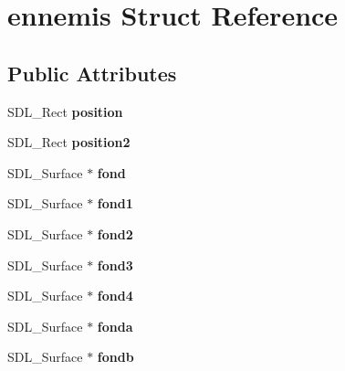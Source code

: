 \hypertarget{structennemis}{}\section{ennemis Struct Reference}
\label{structennemis}
\subsection*{Public Attributes}
\begin{DoxyCompactItemize}
\item 
\mbox{\label{structennemis_a3e8a9864c41c217f29e8fa94c3323414}} 
S\+D\+L\+\_\+\+Rect {\bfseries position}
\item 
\mbox{\label{structennemis_a25ac4c539f00f1d72a98164bbbe17f18}} 
S\+D\+L\+\_\+\+Rect {\bfseries position2}
\item 
\mbox{\label{structennemis_a12545f1dec3d4c2f47ea779e08a832bd}} 
S\+D\+L\+\_\+\+Surface $\ast$ {\bfseries fond}
\item 
\mbox{\label{structennemis_ad566435b5e86ee846b20ca8c261a9d9f}} 
S\+D\+L\+\_\+\+Surface $\ast$ {\bfseries fond1}
\item 
\mbox{\label{structennemis_a7cdce135302cefeedce69637c561ca87}} 
S\+D\+L\+\_\+\+Surface $\ast$ {\bfseries fond2}
\item 
\mbox{\label{structennemis_a966a4674686ad60c8f77acf31d1f4a08}} 
S\+D\+L\+\_\+\+Surface $\ast$ {\bfseries fond3}
\item 
\mbox{\label{structennemis_a16abd6014e78ee7fdf5ab944bc2946a4}} 
S\+D\+L\+\_\+\+Surface $\ast$ {\bfseries fond4}
\item 
\mbox{\label{structennemis_a0656bf1f2a05bd147d373d7eaa3f4285}} 
S\+D\+L\+\_\+\+Surface $\ast$ {\bfseries fonda}
\item 
\mbox{\label{structennemis_aaef083b31ba478455bcbd16ed7235efb}} 
S\+D\+L\+\_\+\+Surface $\ast$ {\bfseries fondb}
\item 
\mbox{\label{structennemis_abcddeea26249480501c3f691e5611345}} 

\end{DoxyCompactItemize}
